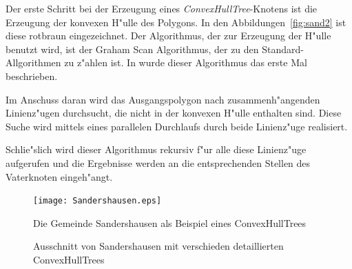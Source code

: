 Der erste Schritt bei der Erzeugung eines \textit{ConvexHullTree}-Knotens ist die Erzeugung der konvexen H"ulle des Polygons. In den Abbildungen~\vref{fig:sand2} ist diese rotbraun eingezeichnet. Der Algorithmus, der zur Erzeugung der H"ulle benutzt wird, ist der Graham Scan Algorithmus, der zu den Standard-Allgorithmen zu z"ahlen ist. In \cite{G72} wurde dieser Algorithmus das erste Mal beschrieben.

Im Anschuss daran wird das Ausgangspolygon nach zusammenh"angenden Linienz"ugen durchsucht, die nicht in der konvexen H"ulle enthalten sind. Diese Suche wird mittels eines parallelen Durchlaufs durch beide Linienz"uge realisiert.

Schlie"slich wird dieser Algorithmus rekursiv f"ur alle diese Linienz"uge aufgerufen und die Ergebnisse werden an die entsprechenden Stellen des Vaterknoten eingeh"angt.

\begin{figure}
	\centering
	\texttt{[image: Sandershausen.eps]}
	\caption{Die Gemeinde Sandershausen als Beispiel eines ConvexHullTrees}
	\label{fig:Sanders}
\end{figure}
\begin{figure}
\hfill
{}
\caption{Ausschnitt von Sandershausen mit verschieden detaillierten ConvexHullTrees}
\label{fig:sand2}
\end{figure}

